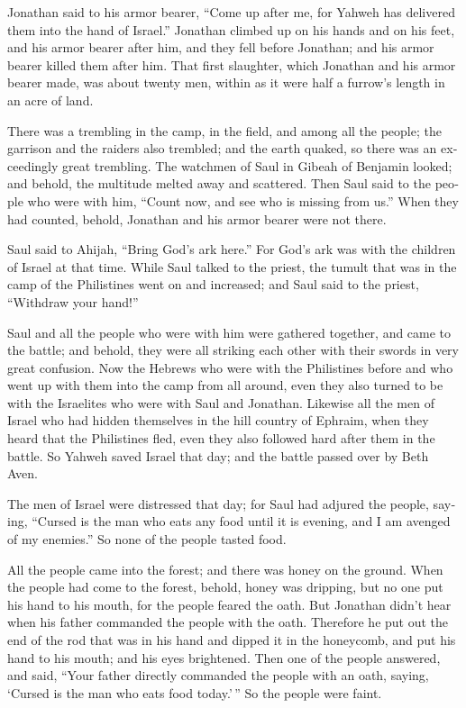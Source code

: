 \begin{paracol}{2}
\begin{otherlanguage}{english}
Jonathan said to his armor bearer, ``Come up after me, for Yahweh has
delivered them into the hand of Israel.''  Jonathan
climbed up on his hands and on his feet, and his armor bearer after him,
and they fell before Jonathan; and his armor bearer killed them after
him.  That first slaughter, which Jonathan and his armor
bearer made, was about twenty men, within as it were half a furrow's
length in an acre of land.

 There was a trembling in the camp, in the field, and
among all the people; the garrison and the raiders also trembled; and
the earth quaked, so there was an exceedingly great trembling.
 The watchmen of Saul in Gibeah of Benjamin looked; and
behold, the multitude melted away and scattered.  Then
Saul said to the people who were with him, ``Count now, and see who is
missing from us.'' When they had counted, behold, Jonathan and his armor
bearer were not there.

 Saul said to Ahijah, ``Bring God's ark here.'' For God's
ark was with the children of Israel at that time.  While
Saul talked to the priest, the tumult that was in the camp of the
Philistines went on and increased; and Saul said to the priest,
``Withdraw your hand!''

 Saul and all the people who were with him were gathered
together, and came to the battle; and behold, they were all striking
each other with their swords in very great confusion. 
Now the Hebrews who were with the Philistines before and who went up
with them into the camp from all around, even they also turned to be
with the Israelites who were with Saul and Jonathan. 
Likewise all the men of Israel who had hidden themselves in the hill
country of Ephraim, when they heard that the Philistines fled, even they
also followed hard after them in the battle.  So Yahweh
saved Israel that day; and the battle passed over by Beth Aven.

 The men of Israel were distressed that day; for Saul had
adjured the people, saying, ``Cursed is the man who eats any food until
it is evening, and I am avenged of my enemies.'' So none of the people
tasted food.

 All the people came into the forest; and there was honey
on the ground.  When the people had come to the forest,
behold, honey was dripping, but no one put his hand to his mouth, for
the people feared the oath.  But Jonathan didn't hear
when his father commanded the people with the oath. Therefore he put out
the end of the rod that was in his hand and dipped it in the honeycomb,
and put his hand to his mouth; and his eyes brightened. 
Then one of the people answered, and said, ``Your father directly
commanded the people with an oath, saying, `Cursed is the man who eats
food today.'\,'' So the people were faint.


\end{otherlanguage}
\end{paracol}

